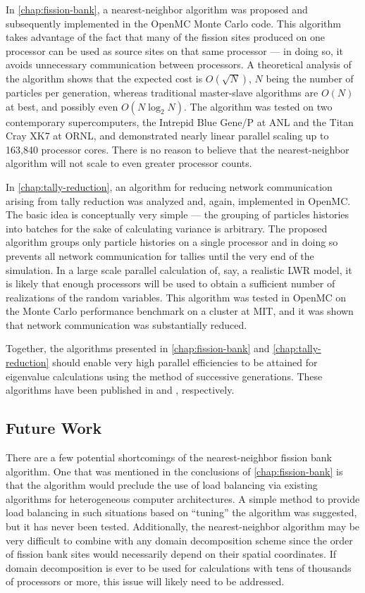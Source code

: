 In \autoref{chap:fission-bank}, a nearest-neighbor algorithm was proposed and
subsequently implemented in the OpenMC Monte Carlo code. This algorithm takes
advantage of the fact that many of the fission sites produced on one processor
can be used as source sites on that same processor --- in doing so, it avoids
unnecessary communication between processors. A theoretical analysis of the
algorithm shows that the expected cost is $O(\sqrt{N})$, $N$ being the number of
particles per generation, whereas traditional master-slave algorithms are $O(N)$
at best, and possibly even $O(N \log_2 N)$. The algorithm was tested on two
contemporary supercomputers, the Intrepid Blue Gene/P at ANL and the Titan Cray
XK7 at ORNL, and demonstrated nearly linear parallel scaling up to 163,840
processor cores. There is no reason to believe that the nearest-neighbor
algorithm will not scale to even greater processor counts.

In \autoref{chap:tally-reduction}, an algorithm for reducing network
communication arising from tally reduction was analyzed and, again, implemented
in OpenMC. The basic idea is conceptually very simple --- the grouping of
particles histories into batches for the sake of calculating variance is
arbitrary. The proposed algorithm groups only particle histories on a single
processor and in doing so prevents all network communication for tallies until
the very end of the simulation. In a large scale parallel calculation of, say, a
realistic LWR model, it is likely that enough processors will be used to obtain
a sufficient number of realizations of the random variables. This algorithm was
tested in OpenMC on the Monte Carlo performance benchmark on a cluster at MIT,
and it was shown that network communication was substantially reduced.

Together, the algorithms presented in \autoref{chap:fission-bank} and
\autoref{chap:tally-reduction} should enable very high parallel efficiencies to
be attained for eigenvalue calculations using the method of successive
generations. These algorithms have been published in \cite{nse-romano-2012} and
\cite{trans-romano-2012}, respectively.

\subsection{Future Work}

There are a few potential shortcomings of the nearest-neighbor fission bank
algorithm. One that was mentioned in the conclusions of
\autoref{chap:fission-bank} is that the algorithm would preclude the use of load
balancing via existing algorithms for heterogeneous computer architectures. A
simple method to provide load balancing in such situations based on ``tuning''
the algorithm was suggested, but it has never been tested. Additionally, the
nearest-neighbor algorithm may be very difficult to combine with any domain
decomposition scheme since the order of fission bank sites would necessarily
depend on their spatial coordinates. If domain decomposition is ever to be used
for calculations with tens of thousands of processors or more, this issue will
likely need to be addressed.

